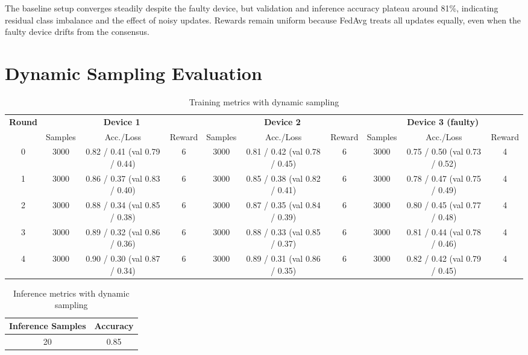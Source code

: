 The baseline setup converges steadily despite the faulty device, but validation and inference accuracy plateau around 81\%, indicating residual class imbalance and the effect of noisy updates. Rewards remain uniform because FedAvg treats all updates equally, even when the faulty device drifts from the consensus.

\section{Dynamic Sampling Evaluation}

\begin{table}[h!]
    \centering
    \caption{Training metrics with dynamic sampling}
    \label{tab:dynamic_sampling}
    \begin{tabular}{c|ccc|ccc|ccc}
        \toprule
        \multirow{2}{*}{\textbf{Round}} & \multicolumn{3}{c|}{\textbf{Device 1}} & \multicolumn{3}{c|}{\textbf{Device 2}} & \multicolumn{3}{c}{\textbf{Device 3 (faulty)}} \\
        & Samples & Acc./Loss & Reward & Samples & Acc./Loss & Reward & Samples & Acc./Loss & Reward \\
        \midrule
        0 & 3000 & 0.82 / 0.41 (val 0.79 / 0.44) & 6 & 3000 & 0.81 / 0.42 (val 0.78 / 0.45) & 6 & 3000 & 0.75 / 0.50 (val 0.73 / 0.52) & 4 \\
        1 & 3000 & 0.86 / 0.37 (val 0.83 / 0.40) & 6 & 3000 & 0.85 / 0.38 (val 0.82 / 0.41) & 6 & 3000 & 0.78 / 0.47 (val 0.75 / 0.49) & 4 \\
        2 & 3000 & 0.88 / 0.34 (val 0.85 / 0.38) & 6 & 3000 & 0.87 / 0.35 (val 0.84 / 0.39) & 6 & 3000 & 0.80 / 0.45 (val 0.77 / 0.48) & 4 \\
        3 & 3000 & 0.89 / 0.32 (val 0.86 / 0.36) & 6 & 3000 & 0.88 / 0.33 (val 0.85 / 0.37) & 6 & 3000 & 0.81 / 0.44 (val 0.78 / 0.46) & 4 \\
        4 & 3000 & 0.90 / 0.30 (val 0.87 / 0.34) & 6 & 3000 & 0.89 / 0.31 (val 0.86 / 0.35) & 6 & 3000 & 0.82 / 0.42 (val 0.79 / 0.45) & 4 \\
        \bottomrule
    \end{tabular}
\end{table}

\begin{table}[h!]
    \centering
    \caption{Inference metrics with dynamic sampling}
    \label{tab:dynamic_inference}
    \begin{tabular}{c c}
        \toprule
        \textbf{Inference Samples} & \textbf{Accuracy} \\
        \midrule
        20 & 0.85 \\
        \bottomrule
    \end{tabular}
\end{table}

